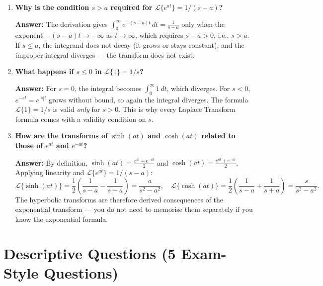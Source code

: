 \documentclass[12pt,a4paper]{article}
\begin{document}
\begin{enumerate}[leftmargin=1.5em, label=\textbf{Q\arabic*.}]
\item \textbf{Why is the condition $s > a$ required for $\mathcal{L}\{e^{at}\} = 1/(s-a)$?}

\textbf{Answer:} The derivation gives $\int_0^{\infty}e^{-(s-a)t}\,dt = \frac{1}{s-a}$ only when the exponent $-(s-a)t \to -\infty$ as $t \to \infty$, which requires $s - a > 0$, i.e., $s > a$. If $s \leq a$, the integrand does not decay (it grows or stays constant), and the improper integral diverges --- the transform does not exist.

\item \textbf{What happens if $s \leq 0$ in $\mathcal{L}\{1\} = 1/s$?}

\textbf{Answer:} For $s = 0$, the integral becomes $\int_0^{\infty}1\,dt$, which diverges. For $s < 0$, $e^{-st} = e^{|s|t}$ grows without bound, so again the integral diverges. The formula $\mathcal{L}\{1\} = 1/s$ is valid \emph{only} for $s > 0$. This is why every Laplace Transform formula comes with a validity condition on $s$.

\item \textbf{How are the transforms of $\sinh(at)$ and $\cosh(at)$ related to those of $e^{at}$ and $e^{-at}$?}

\textbf{Answer:} By definition, $\sinh(at) = \frac{e^{at}-e^{-at}}{2}$ and $\cosh(at) = \frac{e^{at}+e^{-at}}{2}$. Applying linearity and $\mathcal{L}\{e^{at}\} = 1/(s-a)$:
\[
\mathcal{L}\{\sinh(at)\} = \frac{1}{2}\!\left(\frac{1}{s-a}-\frac{1}{s+a}\right) = \frac{a}{s^2-a^2}, \quad
\mathcal{L}\{\cosh(at)\} = \frac{1}{2}\!\left(\frac{1}{s-a}+\frac{1}{s+a}\right) = \frac{s}{s^2-a^2}.
\]
The hyperbolic transforms are therefore derived consequences of the exponential transform --- you do not need to memorise them separately if you know the exponential formula.

\end{enumerate}

\section{Descriptive Questions (5 Exam-Style Questions)}
\end{document}
